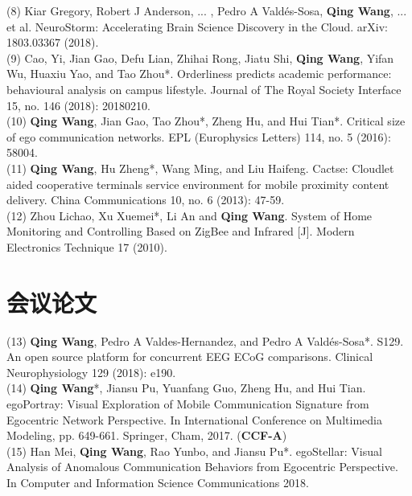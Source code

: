 \documentclass{resume}
\begin{document}
(8) Kiar Gregory, Robert J Anderson, ... , Pedro A Vald{\'e}s-Sosa, \textbf{Qing Wang}, ... et al. NeuroStorm: Accelerating Brain Science Discovery in the Cloud. arXiv: 1803.03367 (2018). \\
(9) Cao, Yi, Jian Gao, Defu Lian, Zhihai Rong, Jiatu Shi, \textbf{Qing Wang}, Yifan Wu, Huaxiu Yao, and Tao Zhou*. Orderliness predicts academic performance: behavioural analysis on campus lifestyle. Journal of The Royal Society Interface 15, no. 146 (2018): 20180210.\\
(10) \textbf{Qing Wang}, Jian Gao, Tao Zhou*, Zheng Hu, and Hui Tian*. Critical size of ego communication networks. EPL (Europhysics Letters) 114, no. 5 (2016): 58004.\\
(11) \textbf{Qing Wang}, Hu Zheng*, Wang Ming, and Liu Haifeng. Cactse: Cloudlet aided cooperative terminals service environment for mobile proximity content delivery. China Communications 10, no. 6 (2013): 47-59.\\
(12) Zhou Lichao, Xu Xuemei*, Li An and \textbf{Qing Wang}. System of Home Monitoring and Controlling Based on ZigBee and Infrared [J]. Modern Electronics Technique 17 (2010).\\

\section{会议论文}
(13) \textbf{Qing Wang}, Pedro A Valdes-Hernandez, and Pedro A Vald{\'e}s-Sosa*. S129. An open source platform for concurrent EEG ECoG comparisons. Clinical Neurophysiology 129 (2018): e190.\\
(14) \textbf{Qing Wang}*, Jiansu Pu, Yuanfang Guo, Zheng Hu, and Hui Tian. egoPortray: Visual Exploration of Mobile Communication Signature from Egocentric Network Perspective. In International Conference on Multimedia Modeling, pp. 649-661. Springer, Cham, 2017. (\textbf{CCF-A})\\
(15) Han Mei, \textbf{Qing Wang}, Rao Yunbo, and Jiansu Pu*. egoStellar: Visual Analysis of Anomalous Communication Behaviors from Egocentric Perspective. In Computer and Information Science Communications 2018.\\

\end{document}
